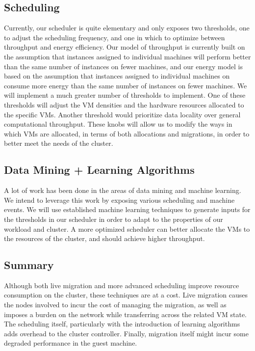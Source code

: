 

\subsection{Scheduling}

Currently, our scheduler is quite elementary and only exposes two thresholds, one to adjust the scheduling frequency, and one in which to optimize between throughput and energy efficiency.  Our model of throughput is currently built on the assumption that instances assigned to individual machines will perform better than the same number of instances on fewer machines, and our energy model is based on the assumption that instances assigned to individual machines on consume more energy than the same number of instances on fewer machines.  We will implement a much greater number of thresholds to implement.  One of these thresholds will adjust the VM densities and the hardware resources allocated to the specific VMs.  Another threshold would prioritize data locality over general computational throughput.  These knobs will allow us to modify the ways in which VMs are allocated, in terms of both allocations and migrations, in order to better meet the needs of the cluster.

\subsection{Data Mining + Learning Algorithms}

A lot of work has been done in the areas of data mining and machine learning.  We intend to leverage this work by exposing various scheduling and machine events.  We will use established machine learning techniques to generate inputs for the thresholds in our scheduler in order to adapt to the properties of our workload and cluster.  A more optimized scheduler can better allocate the VMs to the resources of the cluster, and should achieve higher throughput.

\subsection{Summary}

Although both live migration and more advanced scheduling improve resource consumption on the cluster, these techniques are at a cost.  Live migration causes the nodes involved to incur the cost of managing the migration, as well as imposes a burden on the network while transferring across the related VM state.  The scheduling itself, particularly with the introduction of learning algorithms adds overhead to the cluster controller.  Finally, migration itself might incur some degraded performance in the guest machine.

